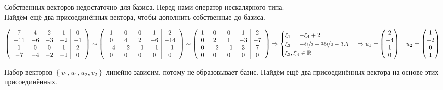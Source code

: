 \documentclass{article}
\begin{document}
\begin{center}
Собственных векторов недостаточно для базиса. Перед нами оператор нескалярного типа. \\
Найдём ещё два присоединённых вектора, чтобы дополнить собственные до базиса.
\end{center}
$$\left(\begin{array}{cccc|c}
7 & 4 & 2 & 1 & 0\\
-11 & -6 & -3 & -2 & -1 \\
1 & 0 & 0 & 1 & 2\\
-7 & -4 & -2 & -1 & 0
\end{array}\right) \sim \left(\begin{array}{cccc|c}
1 & 0 & 0 & 1 & 2\\
0 & 4 & 2 & -6 & -14\\
-4 & -2 & -1 & -1 & -1 \\
0 & 0 & 0 & 0 & 0
\end{array}\right) \sim \left(\begin{array}{cccc|c}
1 & 0 & 0 & 1 & 2\\
0 & 2 & 1 & -3 & -7\\
0 & -2 & -1 & 3 & 7 \\
0 & 0 & 0 & 0 & 0
\end{array}\right) \Rightarrow \begin{cases}
\xi_1 = -\xi_4 + 2 \\
\xi_2 = -\nicefrac{\xi_3}{2} +\nicefrac{3\xi_4}{2} - 3.5 \\
\xi_3, \xi_4 \in \mathbb{R}
\end{cases} \Rightarrow u_1 = \begin{pmatrix}
2 \\ -4 \\ 1 \\ 0
\end{pmatrix}\quad u_2 = \begin{pmatrix}
1 \\ -2 \\ 0 \\ 1
\end{pmatrix}$$
\begin{center}
Набор векторов $\left\{v_1, u_1, u_2, v_2\right\}$ линейно зависим, потому не образовывает базис. Найдём ещё два присоединённых вектора на основе этих присоединённых.
\end{center}
\end{document}
